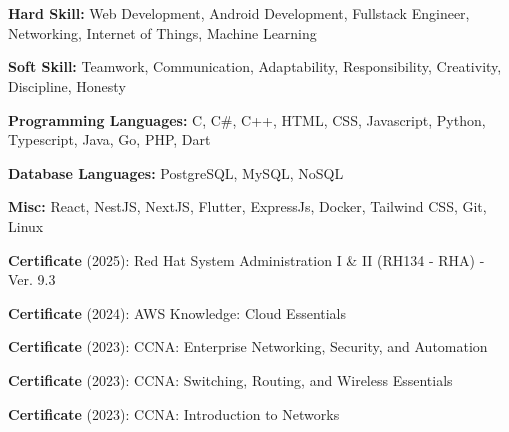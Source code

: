 \documentclass[../main.tex]{subfiles}
\begin{document}
\section{}
\begin{highlights}
    \item \textbf{Hard Skill:} Web Development, Android Development, Fullstack Engineer, Networking, Internet of Things, Machine Learning
    \item \textbf{Soft Skill:} Teamwork, Communication, Adaptability, Responsibility, Creativity, Discipline, Honesty
    \item \textbf{Programming Languages:} C, C\#, C++, HTML, CSS, Javascript, Python, Typescript, Java, Go, PHP, Dart
    \item \textbf{Database Languages:} PostgreSQL, MySQL, NoSQL
    \item \textbf{Misc:} React, NestJS, NextJS, Flutter, ExpressJs, Docker, Tailwind CSS, Git, Linux
    \item \textbf{Certificate} (2025): Red Hat System Administration I \& II (RH134 - RHA) - Ver. 9.3
    \item \textbf{Certificate} (2024): AWS Knowledge: Cloud Essentials
    \item \textbf{Certificate} (2023): CCNA: Enterprise Networking, Security, and Automation
    \item \textbf{Certificate} (2023): CCNA: Switching, Routing, and Wireless Essentials
    \item \textbf{Certificate} (2023): CCNA: Introduction to Networks
\end{highlights}
\end{document}
